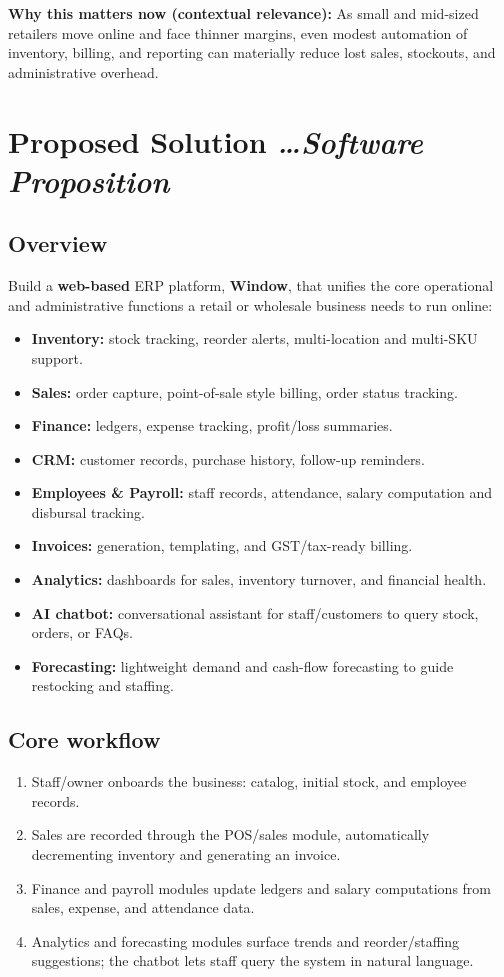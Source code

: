 \documentclass[11pt,a4paper]{article}
\newcommand{\BvrHint}[1]{%
  {\normalfont\normalsize\itshape\hfill #1}}
\begin{document}
\textbf{Why this matters now (contextual relevance):} As small and mid-sized retailers move online and face thinner margins, even modest automation of inventory, billing, and reporting can materially reduce lost sales, stockouts, and administrative overhead.

\section{Proposed Solution %
\BvrHint{\ldots Software Proposition}}
\subsection{Overview}
Build a \textbf{web-based} ERP platform, \textbf{Window}, that unifies the core operational and administrative functions a retail or wholesale business needs to run online:
\begin{itemize}[leftmargin=0.7cm]
    \item \textbf{Inventory:} stock tracking, reorder alerts, multi-location and multi-SKU support.
    \item \textbf{Sales:} order capture, point-of-sale style billing, order status tracking.
    \item \textbf{Finance:} ledgers, expense tracking, profit/loss summaries.
    \item \textbf{CRM:} customer records, purchase history, follow-up reminders.
    \item \textbf{Employees \& Payroll:} staff records, attendance, salary computation and disbursal tracking.
    \item \textbf{Invoices:} generation, templating, and GST/tax-ready billing.
    \item \textbf{Analytics:} dashboards for sales, inventory turnover, and financial health.
    \item \textbf{AI chatbot:} conversational assistant for staff/customers to query stock, orders, or FAQs.
    \item \textbf{Forecasting:} lightweight demand and cash-flow forecasting to guide restocking and staffing.
\end{itemize}

\subsection{Core workflow}
\begin{enumerate}[leftmargin=0.7cm]
    \item Staff/owner onboards the business: catalog, initial stock, and employee records.
    \item Sales are recorded through the POS/sales module, automatically decrementing inventory and generating an invoice.
    \item Finance and payroll modules update ledgers and salary computations from sales, expense, and attendance data.
    \item Analytics and forecasting modules surface trends and reorder/staffing suggestions; the chatbot lets staff query the system in natural language.
\end{enumerate}
\end{document}
